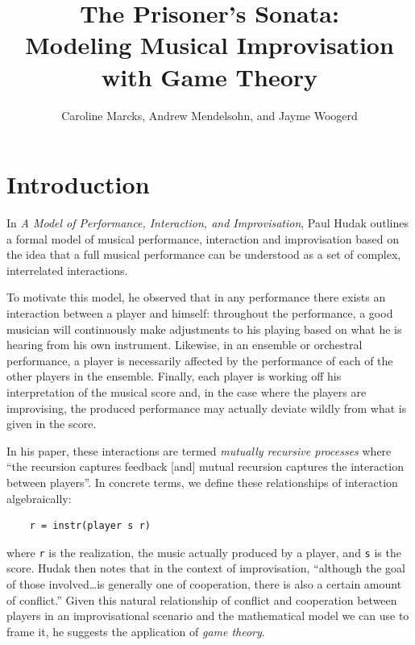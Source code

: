 \documentclass{article}
\begin{document}
\title{The Prisoner's Sonata: \\ \large Modeling Musical Improvisation with Game Theory}
\date{}
\author{Caroline Marcks, Andrew Mendelsohn, and Jayme Woogerd}
\maketitle


\section{Introduction}

In \emph{A Model of Performance, Interaction, and Improvisation}, Paul
Hudak outlines a formal model of musical performance, interaction and
improvisation based on the idea that a full musical performance can be
understood as a set of complex, interrelated interactions.

To motivate this model, he observed that in any performance there exists
an interaction between a player and himself: throughout the performance,
a good musician will continuously make adjustments to his playing based
on what he is hearing from his own instrument. Likewise, in an ensemble
or orchestral performance, a player is necessarily affected by the
performance of each of the other players in the ensemble. Finally, each
player is working off his interpretation of the musical score
and, in the case where the players are improvising, the produced
performance may actually deviate wildly from what is given in the score.

In his paper, these interactions are termed \emph{mutually recursive
processes} where ``the recursion captures feedback {[}and{]} mutual
recursion captures the interaction between players''. In
concrete terms, we define these relationships of interaction
algebraically:

\begin{verbatim}
    r = instr(player s r)
\end{verbatim}


where \texttt{r} is the realization, the music actually produced by a
player, and \texttt{s} is the score. Hudak then notes that in the
context of improvisation, ``although the goal of those involved\ldots{}is generally one of cooperation, there is also a certain amount of
conflict.'' Given this natural relationship of conflict and cooperation
between players in an improvisational scenario and the mathematical
model we can use to frame it, he suggests the application of \emph{game
theory}.
\end{document}
